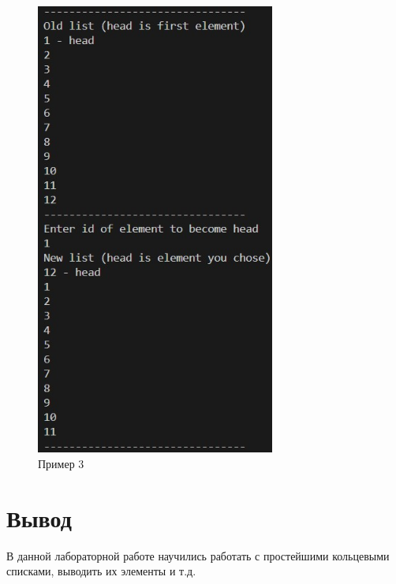 \documentclass[a4paper,12pt]{report}
\begin{document}
\begin{figure}[ph]
\includegraphics[width=0.7\textwidth]{ex3.jpg}
\caption{Пример 3}


\end{figure}


\newpage

\section*{Вывод}
В данной лабораторной работе научились работать с простейшими кольцевыми списками, выводить их элементы и т.д.
\end{document}
